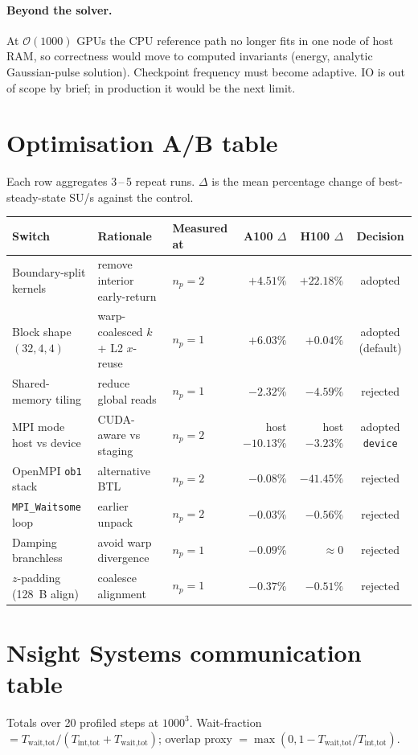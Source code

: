 \documentclass[10pt,a4paper]{article}
\begin{document}
\paragraph{Beyond the solver.}
At $\mathcal{O}(1000)$ GPUs the CPU reference path no longer fits in one node of host RAM, so correctness would move to computed invariants (energy, analytic Gaussian-pulse solution). Checkpoint frequency must become adaptive. IO is out of scope by brief; in production it would be the next limit.

\clearpage
\appendix
\section{Optimisation A/B table}
\label{app:ab}
Each row aggregates 3\,--\,5 repeat runs. $\Delta$ is the mean percentage change of best-steady-state SU/s against the control. 

\begin{center}\small
\begin{tabular}{@{}lllrrc@{}}
\toprule
Switch & Rationale & Measured at & A100 $\Delta$ & H100 $\Delta$ & Decision \\
\midrule
Boundary-split kernels & remove interior early-return & $n_p{=}2$ & $+4.51\%$ & $+22.18\%$ & adopted \\
Block shape $(32,4,4)$ & warp-coalesced $k$ + L2 $x$-reuse & $n_p{=}1$ & $+6.03\%$ & $+0.04\%$ & adopted (default) \\
Shared-memory tiling & reduce global reads & $n_p{=}1$ & $-2.32\%$ & $-4.59\%$ & rejected \\
MPI mode host vs device & CUDA-aware vs staging & $n_p{=}2$ & host $-10.13\%$ & host $-3.23\%$ & adopted \texttt{device} \\
OpenMPI \texttt{ob1} stack & alternative BTL & $n_p{=}2$ & $-0.08\%$ & $-41.45\%$ & rejected \\
\texttt{MPI\_Waitsome} loop & earlier unpack & $n_p{=}2$ & $-0.03\%$ & $-0.56\%$ & rejected \\
Damping branchless & avoid warp divergence & $n_p{=}1$ & $-0.09\%$ & $\approx 0$ & rejected \\
$z$-padding (128~B align) & coalesce alignment & $n_p{=}1$ & $-0.37\%$ & $-0.51\%$ & rejected \\
\bottomrule
\end{tabular}
\end{center}

\section{Nsight Systems communication table}
\label{app:nsys}
Totals over 20 profiled steps at $1000^3$. Wait-fraction $=T_{\text{wait,tot}}/(T_{\text{int,tot}}{+}T_{\text{wait,tot}})$; overlap proxy $=\max(0,1-T_{\text{wait,tot}}/T_{\text{int,tot}})$.
\end{document}
